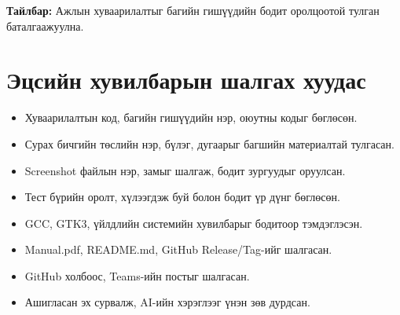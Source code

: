 \documentclass[12pt,a4paper]{report}
\begin{document}
\noindent\textbf{Тайлбар:} Ажлын хуваарилалтыг багийн гишүүдийн бодит оролцоотой тулган баталгаажуулна.

\appendix\chapter{Эцсийн хувилбарын шалгах хуудас}
\begin{itemize}
\item[$\square$] Хуваарилалтын код, багийн гишүүдийн нэр, оюутны кодыг бөглөсөн.
\item[$\square$] Сурах бичгийн төслийн нэр, бүлэг, дугаарыг багшийн материалтай тулгасан.
\item[$\square$] Screenshot файлын нэр, замыг шалгаж, бодит зургуудыг оруулсан.
\item[$\square$] Тест бүрийн оролт, хүлээгдэж буй болон бодит үр дүнг бөглөсөн.
\item[$\square$] GCC, GTK3, үйлдлийн системийн хувилбарыг бодитоор тэмдэглэсэн.
\item[$\square$] Manual.pdf, README.md, GitHub Release/Tag-ийг шалгасан.
\item[$\square$] GitHub холбоос, Teams-ийн постыг шалгасан.
\item[$\square$] Ашигласан эх сурвалж, AI-ийн хэрэглээг үнэн зөв дурдсан.
\end{itemize}
\end{document}

